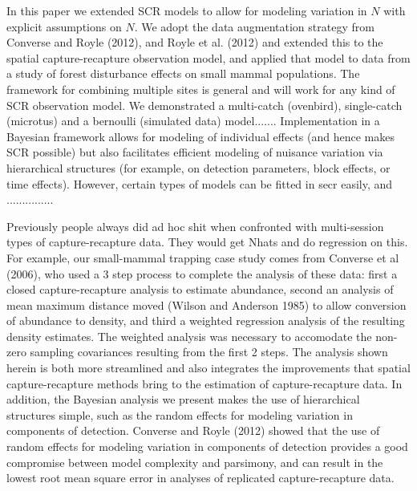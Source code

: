 In this paper we extended SCR models to allow for modeling variation
in $N$ with explicit assumptions on $N$. We adopt the data
augmentation strategy from Converse and Royle (2012), and Royle et
al. (2012) and extended this to the spatial capture-recapture
observation model, and applied that model to data from a study of
forest disturbance effects on small mammal populations.  
The framework for combining multiple sites is general and will
work for any kind of SCR observation model.
We demonstrated a multi-catch (ovenbird), single-catch (microtus)
and a bernoulli (simulated data) model.......
Implementation in a Bayesian framework allows for modeling
of individual effects (and hence makes SCR possible) but also
facilitates efficient modeling of nuisance variation via hierarchical
structures (for example, on detection parameters, block effects, or
time effects). However, certain types of models can be fitted in secr
easily, and ...............


Previously people always did ad hoc shit when confronted with
multi-session types of capture-recapture data. They would get Nhats
and do regression on this. For example, 
our small-mammal trapping case study comes from 
Converse et al (2006), who used
a 3 step process to complete the analysis of these data: first a
closed capture-recapture analysis to estimate abundance, second an
analysis of mean maximum distance moved (Wilson and Anderson 1985) to
allow conversion of abundance to density, and third a weighted
regression analysis of the  resulting density estimates. The
weighted analysis was necessary to accomodate the non-zero sampling
covariances resulting from the first 2 steps. The analysis shown
herein is both more streamlined and also integrates the improvements
that spatial capture-recapture methods bring to the estimation of
capture-recapture data. In addition, the Bayesian analysis we present
makes the use of hierarchical structures simple, such as the random effects
for modeling variation in components of detection. Converse
and Royle (2012) showed that the use of random effects for modeling
variation in components of detection provides a good compromise
between model complexity and parsimony, and can result in the lowest root
mean square error in analyses of replicated capture-recapture data.









